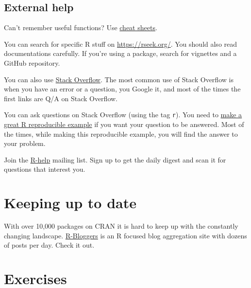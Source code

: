 \documentclass[]{book}
\theoremstyle{definition}
\theoremstyle{definition}
\theoremstyle{definition}
\theoremstyle{remark}
\begin{document}
\subsection{External help}\label{external-help}

Can't remember useful functions? Use
\href{https://www.rstudio.com/resources/cheatsheets/}{cheat sheets}.

You can search for specific R stuff on \url{https://rseek.org/}. You
should also read documentations carefully. If you're using a package,
search for vignettes and a GitHub repository.

You can also use \href{https://stackoverflow.com/}{Stack Overflow}. The
most common use of Stack Overflow is when you have an error or a
question, you Google it, and most of the times the first links are Q/A
on Stack Overflow.

You can ask questions on Stack Overflow (using the tag \texttt{r}). You
need to
\href{https://stackoverflow.com/questions/5963269/how-to-make-a-great-r-reproducible-example}{make
a great R reproducible example} if you want your question to be
answered. Most of the times, while making this reproducible example, you
will find the answer to your problem.

Join the \href{https://www.r-project.org/mail.html}{R-help} mailing
list. Sign up to get the daily digest and scan it for questions that
interest you.

\section{Keeping up to date}\label{keeping-up-to-date}

With over 10,000 packages on CRAN it is hard to keep up with the
constantly changing landscape.
\href{https://www.r-bloggers.com/}{R-Bloggers} is an R focused blog
aggregation site with dozens of posts per day. Check it out.

\section{Exercises}\label{exercises}
\end{document}
